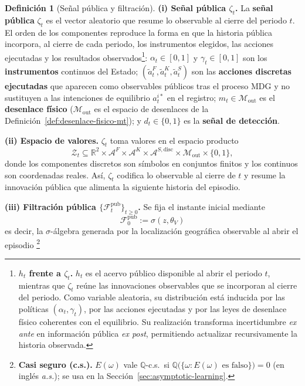 \documentclass[12pt]{article}
\newenvironment{fnnote}{%
  \begin{minipage}[t]{\linewidth}%
  \sloppy
}{\end{minipage}}
\theoremstyle{definition}
\newtheorem{definition}[theorem]{Definición}
\theoremstyle{remark}
\newcommand{\1}{\mathbf{1}}
\begin{document}
\begin{definition}[Señal pública y filtración]
\label{def:zeta-filtration}
\noindent\textbf{\textup{(i)} Señal pública $\zeta_t$.}\quad
La \textbf{señal pública} $\zeta_t$ es el vector aleatorio que resume lo observable al cierre del periodo $t$. El orden de los componentes reproduce la forma en que la historia pública incorpora, al cierre de cada periodo, los instrumentos elegidos, las acciones ejecutadas y los resultados observados\footnote{%
\begin{fnnote}
\textbf{$h_t$ frente a $\zeta_t$.} $h_t$ es el acervo público disponible al abrir el periodo $t$, mientras que $\zeta_t$ reúne las innovaciones observables que se incorporan al cierre del periodo. Como variable aleatoria, su distribución está inducida por las políticas $(\alpha_t,\gamma_t)$, por las acciones ejecutadas y por las leyes de desenlace físico coherentes con el equilibrio. Su realización transforma incertidumbre \emph{ex ante} en información pública \emph{ex post}, permitiendo actualizar recursivamente la historia observada.
\end{fnnote}}:%
 $\alpha_t\in[0,1]$ y $\gamma_t\in[0,1]$ son los \textbf{instrumentos} continuos del Estado; $(\tilde{a}_t^F,\tilde{a}_t^K,\tilde{a}_t^S)$ son las \textbf{acciones discretas ejecutadas} que aparecen como observables públicos tras el proceso MDG y no sustituyen a las intenciones de equilibrio $a_t^{i\ast}$ en el registro; $m_t\in\mathcal{M}_{\mathrm{out}}$ es el \textbf{desenlace físico} \textup{(}$\mathcal{M}_{\mathrm{out}}$ es el espacio de desenlaces de la Definición~\ref{def:desenlace-fisico-mt}\textup{)}; y $d_t\in\{0,1\}$ es la \textbf{señal de detección}.

\medskip
\noindent\textbf{\textup{(ii)} Espacio de valores.}\quad
$\zeta_t$ toma valores en el espacio producto
\[
\mathcal{Z}_t \subseteq \mathbb{R}^2 \times \mathcal{A}^F \times \mathcal{A}^K \times \mathcal{A}^{S,\mathrm{disc}} \times \mathcal{M}_{\mathrm{out}} \times \{0,1\},
\]
donde los componentes discretos son símbolos en conjuntos finitos y los continuos son coordenadas reales. Así, $\zeta_t$ codifica lo observable al cierre de $t$ y resume la innovación pública que alimenta la siguiente historia del episodio.

\medskip
\noindent\textbf{\textup{(iii)} Filtración pública $\{\mathcal{F}_t^{\mathrm{pub}}\}_{t\ge 0}$.}\quad
Se fija el instante inicial mediante
\[
\mathcal{F}_0^{\mathrm{pub}}:=\sigma(z, \theta_V)
\]
es decir, la $\sigma$-álgebra generada por la localización geográfica observable al abrir el episodio%
\footnote{%
\textbf{Casi seguro \textup{(}c.s.\textup{)}.} $E(\omega)$ vale $\mathbb{Q}$-c.s.\ si $\mathbb{Q}\bigl(\{\omega:E(\omega)\text{ es falso}\}\bigr)=0$ \textup{(}en inglés \emph{a.s.}\textup{)}; se usa en la Sección~\ref{sec:asymptotic-learning}.

}
\end{definition}
\end{document}
